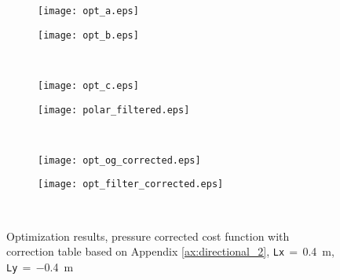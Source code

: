 \begin{figure}[H]
\begin{subfigure}[c]{0.5\textwidth}
\texttt{[image: opt\_a.eps]}
\label{fig:opt_res_a}
\end{subfigure}
\begin{subfigure}[c]{0.5\textwidth}
\texttt{[image: opt\_b.eps]}
\label{fig:opt_res_b}
\end{subfigure}\\
\hspace{0.1\textheight}
\begin{subfigure}[c]{0.5\textwidth}
\texttt{[image: opt\_c.eps]}
\label{fig:opt_res_c}
\end{subfigure}
\begin{subfigure}[c]{0.5\textwidth}
\texttt{[image: polar\_filtered.eps]}
\label{fig:opt_res_d}
\end{subfigure}\\
\hspace{0.1\textheight}
\begin{subfigure}[c]{0.5\textwidth}
\texttt{[image: opt\_og\_corrected.eps]}
\label{fig:opt_res_e}
\end{subfigure}
\begin{subfigure}[c]{0.5\textwidth}
\texttt{[image: opt\_filter\_corrected.eps]}
\label{fig:opt_res_f}
\end{subfigure}\\
\caption{Optimization results, pressure corrected cost function with correction table based on Appendix \ref{ax:directional_2}, \textcolor{green3}{\texttt{Lx}}\,$=$\,\SI{0.4}{\meter}, \textcolor{green3}{\texttt{Ly}}\,$=\,$\SI{-0.4}{\meter}}
		\label{fig:opt_res}
\end{figure}


